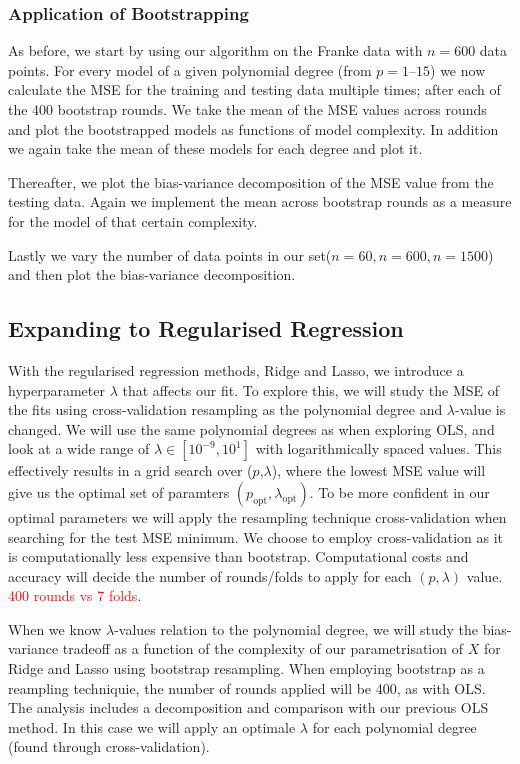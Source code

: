 \documentclass[twocolumn,english,notitlepage]{article}
\newcommand{\comment}[1]{\textcolor{red}{#1}}
\newcommand{\msub}[2]{\ensuremath{{#1}_\text{#2}}}
\begin{document}
        \subsubsection{Application of Bootstrapping}
            As before, we start by using our algorithm on the Franke data with $n=600$ data points. For every model of a given polynomial degree (from $p=1\text{--}15$) we now calculate the MSE for the training and testing data multiple times; after each of the 400 bootstrap rounds. We take the mean of the MSE values across rounds and plot the bootstrapped models as functions of model complexity. In addition we again take the mean of these models for each degree and plot it. 
        
            Thereafter, we plot the bias-variance decomposition of the MSE value from the testing data. Again we implement the mean across bootstrap rounds as a measure for the model of that certain complexity.
        
            Lastly we vary the number of data points in our set($n=60, n=600, n=1500$) and then plot the bias-variance decomposition. 



    
    \subsection{Expanding to Regularised Regression}
        With the regularised regression methods, Ridge and Lasso, we introduce a hyperparameter $\lambda$ that affects our fit. To explore this, we will study the MSE of the fits using cross-validation resampling as the polynomial degree and $\lambda$-value is changed. We will use the same polynomial degrees as when exploring OLS, and look at a wide range of $\lambda \in [10^{-9}, 10^1]$ with logarithmically spaced values. This effectively results in a grid search over ($p$,$\lambda$), where the lowest MSE value will give us the optimal set of paramters $(\msub{p}{opt}, \msub{\lambda}{opt})$. To be more confident in our optimal parameters we will apply the resampling technique cross-validation when searching for the test MSE minimum. We choose to employ cross-validation as it is computationally less expensive than bootstrap. Computational costs and accuracy will decide the number of rounds/folds to apply for each $(p,\lambda)$ value. \comment{400 rounds vs 7 folds}. 
        
        When we know $\lambda$-values relation to the polynomial degree, we will study the bias-variance tradeoff as a function of the complexity of our parametrisation of $X$ for Ridge and Lasso using bootstrap resampling. When employing bootstrap as a reampling techniquie, the number of rounds applied will be 400, as with OLS.  The analysis includes a decomposition and comparison with our previous OLS method. In this case we will apply an optimale $\lambda$ for each polynomial degree (found through cross-validation).
        
\end{document}
